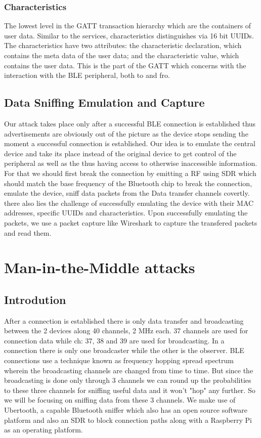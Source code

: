 \documentclass[conference]{IEEEtran}
\begin{document}
\subsubsection{Characteristics}
The lowest level in the GATT transaction hierarchy which are the containers of user data. Similar to the services, characteristics distinguishes via 16 bit UUIDs. The characteristics have two attributes: the characteristic declaration, which contains the meta data of the user data; and the characteristic value, which contains the user data. This is the part of the GATT which concerns with the interaction  with the BLE peripheral, both to and fro.

\subsection{Data Sniffing Emulation and Capture}
Our attack takes place only after a successful BLE connection is established thus advertisements are obviously out of the picture as the device stops sending the moment a successful connection is established. Our idea is to emulate the central device and take its place instead of the original device to get control of the peripheral as well as the  thus having access to otherwise inaccessible information. For that we should first break the connection by emitting a RF using SDR which should match the base frequency of the Bluetooth chip to break the connection, emulate the device, sniff data packets from the Data transfer channels covertly.  there also lies the challenge of successfully emulating the device with their MAC addresses, specific UUIDs and characteristics. Upon successfully emulating the packets, we use a packet capture like Wireshark to capture the transfered packets and read them.

\section{Man-in-the-Middle attacks}
\subsection{Introdution}
After a connection is established there is only data transfer and broadcasting between the 2 devices along 40 channels, 2 MHz each. 37 channels are used for connection data while ch: 37, 38 and 39 are used for broadcasting. In a connection there is only one broadcaster while the other is the observer. BLE connections use a technique known as frequency hopping spread spectrum wherein the broadcasting channels are changed from time to time. But since the broadcasting is done only through 3 channels we can round up the probabilities to these three channels for sniffing useful data and it won't "hop" any further. So we will be focusing on sniffing data from these 3 channels. We make use of Ubertooth, a capable Bluetooth sniffer which also has an open source software platform and also an SDR to block connection paths along with a Raspberry Pi as an operating platform.
\end{document}
